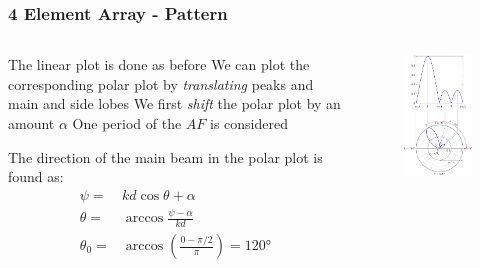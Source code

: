 \documentclass[10pt]{beamer}
\begin{document}
\begin{frame}
    \frametitle{4 Element Array - Pattern}
    \begin{columns}[T] %
        \begin{column}{.7\textwidth}
            \begin{outline}
                \1 The linear plot is done as before
                \1 We can plot the corresponding polar plot by \textit{translating} peaks and main and side lobes
                \1 We first \textit{shift} the polar plot by an amount $\alpha$
                \2 One period of the $AF$ is considered
            \end{outline}
The direction of the main beam in the polar plot is found as:
\begin{align*}
    \psi {}=& k d \cos \theta + \alpha \\
    \theta {}=& \arccos \frac{\psi - \alpha }{k d} \\
    \theta_0 {}=& \arccos \left(\frac{0 - \pi/2 }{\pi}\right) = \ang{120}
\end{align*}
        \end{column}
        \begin{column}{.5\textwidth}
            \begin{figure}[t!]
                \centering
                \includegraphics[height=1.2\textwidth]{Linear_polar_N_4_d_half_alpha_90.pdf}
            \end{figure}
        \end{column}%
    \end{columns}
\end{frame}
\end{document}
